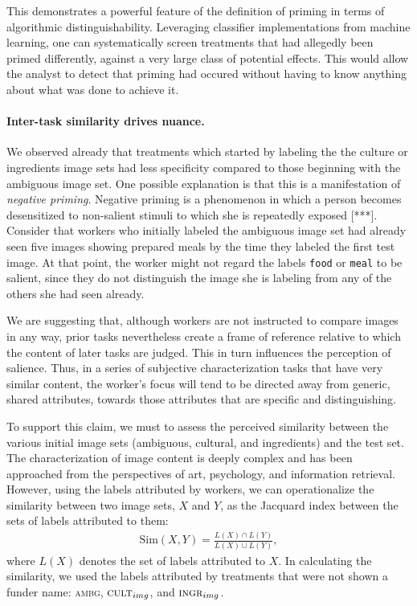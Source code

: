 \documentclass[a4paper]{report}
\begin{document}
This demonstrates a powerful feature of the definition of priming in terms of 
algorithmic distinguishability.  Leveraging classifier implementations from
machine learning, one can systematically screen treatments that had allegedly 
been primed differently, against a very large class of potential effects.  This
would allow the analyst to detect that priming had occured without having to 
know anything about what was done to achieve it.

\paragraph{Inter-task similarity drives nuance.}
We observed already that treatments which started by labeling the the 
culture or ingredients image sets had less specificity compared to 
those beginning with the ambiguous image set.  One possible explanation is that
this is a manifestation of \textit{negative priming}.  Negative priming is a 
phenomenon in which a person becomes desensitized to non-salient stimuli to 
which she is repeatedly exposed [***].  Consider that workers who initially 
labeled the ambiguous image set had already seen five images showing 
prepared meals by the time they labeled the first test image.  At that point,
the worker might not regard the labels \texttt{food} or \texttt{meal} to be 
salient, since they do not distinguish the image she is labeling from any of 
the others she had seen already.

We are suggesting that, although workers are not instructed to compare
images in any way, prior tasks nevertheless create a frame of reference
relative to which the content of later tasks are judged.  This in turn 
influences the perception of salience. Thus, in a series of subjective 
characterization tasks that have very similar content, the worker's focus 
will tend to be directed away from generic, shared attributes, towards those 
attributes that are specific and distinguishing.

To support this
claim, we must to assess the perceived similarity between the various 
initial image sets (ambiguous, cultural, and ingredients) and the test set.  
The characterization of image content is deeply complex and has been 
approached from the perspectives of 
art\cite{panofsky1939studies,shatford1986analyzing},
psychology\cite{Tversky1977327}, and information retrieval\cite{Jaimes20002}.  
However, using the labels attributed by workers, we can operationalize
the similarity between two image sets, $X$ and $Y$, as the Jacquard index 
between the sets of labels attributed to them:
\begin{align}
	\text{Sim}(X,Y) = \frac{L(X) \cap L(Y)}{L(X) \cup L(Y)},
\end{align}
where $L(X)$ denotes the set of labels attributed to $X$.  In calculating
the similarity, we used the labels attributed by treatments that were not 
shown a funder name:  \textsc{ambg}, $\textsc{cult}_{img}$, and 
$\textsc{ingr}_{img}$.
\end{document}
